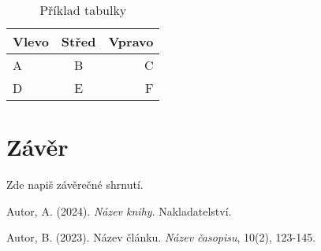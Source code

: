 \documentclass[12pt,a4paper]{article}
\begin{document}
\begin{table}[h]
\centering
\begin{tabular}{|l|c|r|}
\hline
Vlevo & Střed & Vpravo \\
\hline
A & B & C \\
D & E & F \\
\hline
\end{tabular}
\caption{Příklad tabulky}
\label{tab:priklad}
\end{table}

\section{Závěr}

Zde napiš závěrečné shrnutí.

\begin{thebibliography}{9}
Autor, A. (2024). \textit{Název knihy}. Nakladatelství.

Autor, B. (2023). Název článku. \textit{Název časopisu}, 10(2), 123-145.
\end{thebibliography}
\end{document}
